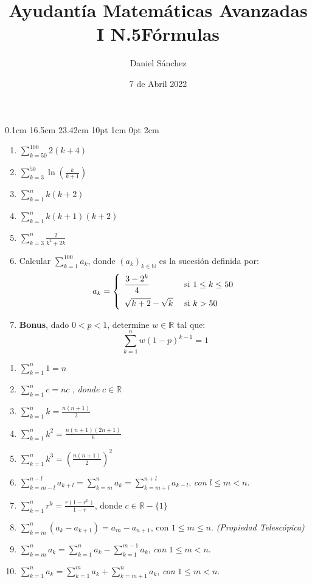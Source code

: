 \documentclass[12pt]{article}
\newcommand{\D}{\displaystyle}
\begin{document}
\setmargins{2.5cm}
{0.1cm}
{16.5cm}
{23.42cm}
{10pt}
{1cm}
{0pt}
{2cm}

\title{Ayudant\'ia Matem\'aticas Avanzadas I N.5}
\date{7 de Abril 2022}
\author{Daniel S\'anchez}
\maketitle

\begin{enumerate}
      \item $\D \sum_{k = 50}^{100} 2(k+4)$
      \item $\D \sum_{k = 3}^{50} \ln \left(\frac{k}{k+1}\right)$
      \item $\D \sum_{k = 1}^{n} k(k+2)$
      \item $\D \sum_{k = 1}^{n} k(k+1)(k+2)$
      \item $\D \sum_{k = 3}^{n} \frac{2}{k^2+2k}$
      \item Calcular $\D \sum_{k=1}^{100} a_k$, donde $(a_k)_{k \in \mathbb{N}}$ es la sucesi\'on definida por:
            $$a_k=\left\{
                  \begin{array}{ll}
                        \D \frac{3-2^k}{4}     & \mbox{ si } 1 \leq k \leq 50 \\[3\jot]
                        \D \sqrt{k+2}-\sqrt{k} & \mbox{ si } k > 50
                  \end{array}
                  \right.$$
      \item \textbf{Bonus}, dado $0 < p < 1$, determine $w \in \mathbb{R}$ tal que:
            $$\D \sum_{k = 1}^{n} w(1-p)^{k-1} = 1$$
\end{enumerate}


\pagebreak
\title{\LARGE{\textbf{F\'ormulas}}}
\maketitle
\begin{enumerate}
      \item $\D \sum_{k = 1}^{n} 1 = n $
      \item $\D \sum_{k = 1}^{n} c = nc $ , \textit{donde} $c \in \mathbb{R}$
      \item $\D \sum_{k = 1}^{n} k = \frac{n(n+1)}{2} $
      \item $\D \sum_{k = 1}^{n} k^2 = \frac{n(n+1)(2n+1)}{6} $
      \item $\D \sum_{k = 1}^{n} k^3 = {\left(\frac{n(n+1)}{2}\right)}^2 $
      \item $\D \sum_{k = m-l}^{n-l} a_{k+l} = \sum_{k = m}^{n} a_k = \sum_{k = m+l}^{n+l} a_{k-l}$, \textit{con} $l \leq m < n$.
      \item $\D \sum_{k = 1}^{n} r^k = \frac{r(1-r^n)}{1-r} $, donde $c \in \mathbb{R}-\{1\}$
      \item $\D \sum_{k = m}^{n} (a_k-a_{k+1}) = a_m-a_{n+1}$, con $1\leq m \leq n$. \textit{(Propiedad Telesc\'opica)}
      \item $\D \sum_{k = m}^{n} a_k = \sum_{k = 1}^{n} a_k - \sum_{k = 1}^{m-1} a_k $, \textit{con} $1 \leq m < n$.
      \item $\D \sum_{k = 1}^{n} a_k = \sum_{k = 1}^{m} a_k + \sum_{k = m+1}^{n} a_k $, \textit{con} $1 \leq m < n$.
\end{enumerate}
\end{document}
